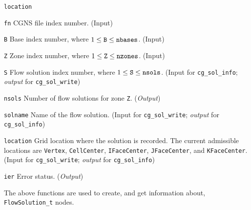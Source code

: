 \begin{Ventryi}{\texttt{location}}\raggedright
\item [\texttt{fn}]
      CGNS file index number.
      (\textcolor{input}{Input})
\item [\texttt{B}]
      Base index number, where $1 \leq \text{\texttt{B}} \leq \text{\texttt{nbases}}$.
      (\textcolor{input}{Input})
\item [\texttt{Z}]
      Zone index number, where $1 \leq \text{\texttt{Z}} \leq \text{\texttt{nzones}}$.
      (\textcolor{input}{Input})
\item [\texttt{S}]
      Flow solution index number, where $1 \leq \text{\texttt{S}} \leq \text{\texttt{nsols}}$.
      (\textcolor{input}{Input} for \texttt{cg\_sol\_info};
      \textcolor{output}{\textit{output}} for \texttt{cg\_sol\_write})
\item [\texttt{nsols}]
      Number of flow solutions for zone \texttt{Z}.
      (\textcolor{output}{\textit{Output}})
\item [\texttt{solname}]
      Name of the flow solution.
      (\textcolor{input}{Input} for \texttt{cg\_sol\_write};
      \textcolor{output}{\textit{output}} for \texttt{cg\_sol\_info})
\item [\texttt{location}]
      Grid location where the solution is recorded.
      The current admissible locations are \texttt{Vertex},
      \texttt{CellCenter}, \texttt{IFaceCenter}, \texttt{JFaceCenter},
      and \texttt{KFaceCenter}.
      (\textcolor{input}{Input} for \texttt{cg\_sol\_write};
      \textcolor{output}{\textit{output}} for \texttt{cg\_sol\_info})
\item [\texttt{ier}]
      Error status.
      (\textcolor{output}{\textit{Output}})
\end{Ventryi}

The above functions are used to create, and get information about,
\texttt{FlowSolution\_t} nodes.

